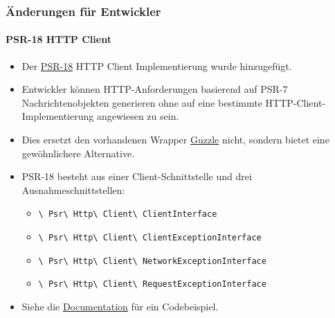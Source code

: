 
\begin{frame}[fragile]
	\frametitle{Änderungen für Entwickler}
	\framesubtitle{PSR-18 HTTP Client}

	\begin{itemize}
		\item Der \href{https://www.php-fig.org/psr/psr-18/}{PSR-18}
			HTTP Client Implementierung wurde hinzugefügt.
		\item Entwickler können HTTP-Anforderungen basierend auf PSR-7 Nachrichtenobjekten generieren
			ohne auf eine bestimmte HTTP-Client-Implementierung angewiesen zu sein.
		\item Dies ersetzt den vorhandenen Wrapper \href{http://guzzlephp.org/}{Guzzle}
			nicht, sondern bietet eine gewöhnlichere Alternative. 
		\item PSR-18 besteht aus einer Client-Schnittstelle und drei Ausnahmeschnittstellen:

			\begin{itemize}\smaller
				\item \texttt{\textbackslash
					Psr\textbackslash
					Http\textbackslash
					Client\textbackslash
					ClientInterface}
				\item \texttt{\textbackslash
					Psr\textbackslash
					Http\textbackslash
					Client\textbackslash
					ClientExceptionInterface}
				\item \texttt{\textbackslash
					Psr\textbackslash
					Http\textbackslash
					Client\textbackslash
					NetworkExceptionInterface}
				\item \texttt{\textbackslash
					Psr\textbackslash
					Http\textbackslash
					Client\textbackslash
					RequestExceptionInterface}
			\end{itemize}\normalsize

		\item Siehe die
			\href{https://docs.typo3.org/c/typo3/cms-core/master/en-us/Changelog/10.1/Feature-89216-PSR-18HTTPClientImplementation.html}{Documentation}
			für ein Codebeispiel.

	\end{itemize}

\end{frame}


